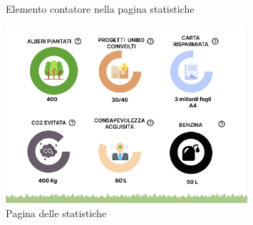 \begin{figure}
    \centering
    \caption{Elemento contatore nella pagina statistiche}
    \label{fig:statItem}
\end{figure}

\begin{figure}
    \centering
    \includegraphics[width=0.8\textwidth]{img/totem/statsPage.png}
    \caption{Pagina delle statistiche}
    \label{fig:statsPage}
\end{figure}

